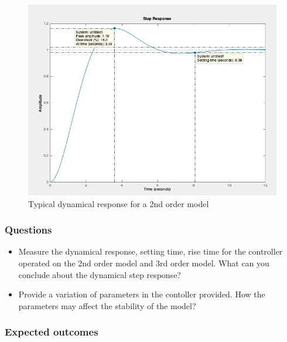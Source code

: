 \documentclass[]{book}
\providecommand{\tightlist}{%
  \setlength{\itemsep}{0pt}\setlength{\parskip}{0pt}}
\theoremstyle{definition}
\theoremstyle{definition}
\theoremstyle{definition}
\theoremstyle{remark}
\begin{document}
\begin{figure}

{\centering \includegraphics{images/p2-04-evaluation} 

}

\caption{Typical dynamical response for a 2nd order model}\label{fig:dynamic2}
\end{figure}

\hypertarget{questions-7}{%
\subsubsection*{Questions}\label{questions-7}}

\begin{itemize}
\tightlist
\item
  Measure the dynamical response, setting time, rise time for the
  controller operated on the 2nd order model and 3rd order model. What
  can you conclude about the dynamical step response?
\item
  Provide a variation of parameters in the contoller provided. How the
  parameters may affect the stability of the model?
\end{itemize}

\hypertarget{expected-outcomes-7}{%
\subsubsection*{Expected outcomes}\label{expected-outcomes-7}}
\end{document}
